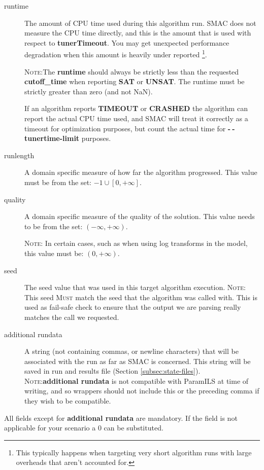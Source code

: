 \documentclass[manual.tex]{subfiles}
\begin{document}
\begin{description}
\item [{runtime}] The amount of CPU time used during this algorithm run.
SMAC does not measure the CPU time directly, and this is the amount
that is used with respect to \textbf{tunerTimeout}. You may get
unexpected performance degradation when this amount is heavily under
reported \footnote{This typically happens when targeting very short algorithm
runs with large overheads that aren't accounted for.}. 

\textsc{Note:}The \textbf{runtime }should always be strictly less
than the requested \textbf{cutoff\_time } when reporting \textbf{SAT
}or \textbf{UNSAT}. The runtime must be strictly greater than zero (and not NaN).

If an algorithm reports \textbf{TIMEOUT} or \textbf{CRASHED} the algorithm can report the actual CPU time used, and SMAC will treat it correctly as a timeout for optimization purposes, but count the actual time for \textbf{-$\!~$-tunertime-limit} purposes.

\item [{runlength}] A domain specific measure of how far the algorithm
progressed. This value must be from the set: ${-1} \cup [0,+\infty]$.

\item [{quality}] A domain specific measure of the quality of the solution. This value needs to be 
from the set: $(-\infty, +\infty)$. 

\textsc{Note}: In certain cases, such as when using log transforms in the model, this value must be: $(0, +\infty)$.

\item [{seed}] The seed value that was used in this target algorithm execution.
\textsc{Note:} This seed \textsc{Must} match the seed that the algorithm was
called with. This is used as fail-safe check to ensure that the output
we are parsing really matches the call we requested.
\item[{additional rundata}] A string (not containing commas, or newline characters) that will be associated with the run as far as SMAC is concerned. This string will be saved in run and results file (Section \ref{subsec:state-files}). \\
\textsc{Note}:\textbf{additional rundata} is not compatible with ParamILS at time of writing, and so wrappers should not include this or the preceding comma if they wish to be compatible.


\end{description}
All fields except for \textbf{additional rundata} are mandatory. If the field is not applicable for your scenario a 0 can be substituted.
\end{document}
